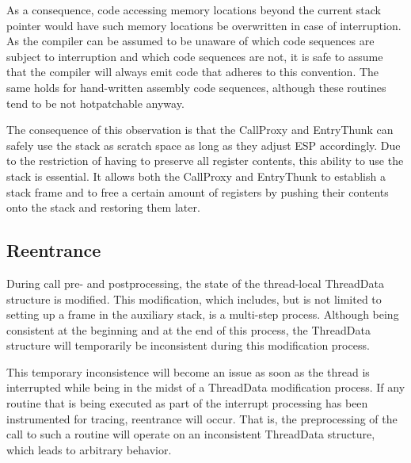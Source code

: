 As a consequence, code accessing memory locations beyond the current stack pointer
would have such memory locations be overwritten in case of interruption. As
the compiler can be assumed to be unaware of which code sequences are subject
to interruption and which code sequences are not, it is safe to assume that the
compiler will always emit code that adheres to this convention. The same holds
for hand-written assembly code sequences, although these routines tend to be not
hotpatchable anyway.

The consequence of this observation is that the CallProxy and EntryThunk can
safely use the stack as scratch space as long as they adjust ESP accordingly.
Due to the restriction of having to preserve all register contents, this ability
to use the stack is essential. It allows both the CallProxy and EntryThunk to
establish a stack frame and to free a certain amount of registers by pushing
their contents onto the stack and restoring them later. 


\subsection{Reentrance}
\label{sec:ThunkReentrance}

During call pre- and postprocessing, the state of the thread-local ThreadData
structure is modified. This modification, which includes, but is not limited to
setting up a frame in the auxiliary stack, is a multi-step process. Although
being consistent at the beginning and at the end of this process, the ThreadData
structure will temporarily be inconsistent during this modification process.

This temporary inconsistence will become an issue as soon as the thread is 
interrupted while being in the midst of a ThreadData modification process. If
any routine that is being executed as part of the interrupt processing has
been instrumented for tracing, reentrance will occur. That is, the preprocessing
of the call to such a routine will operate on an inconsistent ThreadData structure,
which leads to arbitrary behavior. 

